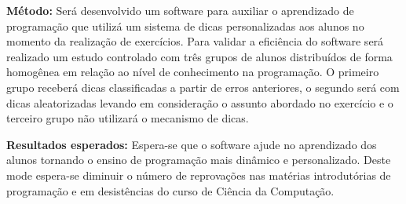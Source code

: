 \documentclass[12pt,english,brazil,a4paper,utf8,oneside]{utfpr-tcc}
\begin{document}
\begin{resumo}
\begin{itemize}
\end{itemize}

\textbf{Método:} Será desenvolvido um software para auxiliar o aprendizado de programação que utilizá um sistema de dicas personalizadas aos alunos no momento da realização de exercícios. Para validar a eficiência do software será realizado um estudo controlado com três grupos de alunos distribuídos de forma homogênea em relação ao nível de conhecimento na programação. O primeiro grupo receberá dicas classificadas a partir de erros anteriores, o segundo será com dicas aleatorizadas levando em consideração o assunto abordado no exercício e o terceiro grupo não utilizará o mecanismo de dicas.

\textbf{Resultados esperados:} Espera-se que o software ajude no aprendizado dos alunos tornando o ensino de programação mais dinâmico e personalizado. Deste mode espera-se diminuir o número de reprovações nas matérias introdutórias de programação e em desistências do curso de Ciência da Computação.

\end{resumo}







\listoffigures
\listoftables

\tableofcontents

\mainmatter



% 



\backmatter
\end{document}
